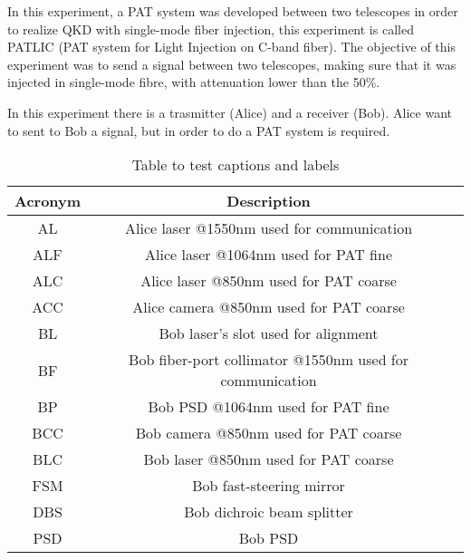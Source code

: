 In this experiment, a PAT system was developed between two telescopes in order to realize QKD with single-mode fiber injection, this experiment is called PATLIC (PAT system for Light Injection on C-band fiber).
The objective of this experiment was to send a signal between two telescopes, making sure that it was injected in single-mode fibre, with attenuation lower than the 50\%.

In this experiment there is a trasmitter (Alice) and a receiver (Bob). Alice want to sent to Bob a signal, but in order to do a PAT system is required.

\begin{table}[h!]
  \centering
  \begin{tabular}{ |c|c|c| }
    \hline
    Acronym & Description                                              \\
    \hline
    AL      & Alice laser @1550nm used for communication               \\
    ALF     & Alice laser @1064nm used for PAT fine                    \\
    ALC     & Alice laser @850nm used for PAT coarse                   \\
    ACC     & Alice camera @850nm used for PAT coarse                  \\
    \hline
    BL      & Bob laser's slot used for alignment                      \\
    BF      & Bob fiber-port collimator @1550nm used for communication \\
    BP      & Bob PSD @1064nm used for PAT fine                        \\
    BCC     & Bob camera @850nm used for PAT coarse                    \\
    BLC     & Bob laser @850nm used for PAT coarse                     \\
    FSM     & Bob fast-steering mirror                                 \\
    DBS     & Bob dichroic beam splitter                               \\
    PSD     & Bob PSD                                                  \\
    \hline
  \end{tabular}
  \caption{Table to test captions and labels}
  \label{table:1}
\end{table}

